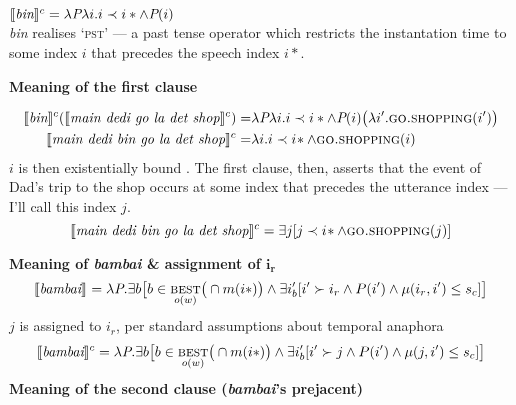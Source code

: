 $\denote[c]{\textit{bin}}= \lambda\textit{P}\lambda i.i\prec i*\wedge\textit{P}(i)$\\
 \textit{bin} realises `\textsc{pst}' --- a past tense operator which restricts the instantation time to some index $ i $ that precedes the speech index $ i* $.
 

\a \textbf{Meaning of the first clause}

\begin{align*}
\denote[c]{\textit{bin}}(\denote[c]{\textit{main dedi go la det shop}})=&\lambda\textit{P}\lambda i.i\prec i*\wedge\textit{P}(i)\big(\lambda i'.\textsc{go.shopping}(i')\big)\\
\denote[c]{\textit{main dedi bin go la det shop}}=&\lambda i.i\prec i\!*\wedge \textsc{go.shopping}(i)%
\end{align*}
$ i $ is then existentially bound \citep{Dowty1979,Stump1985,Ogihara1996}. The first clause, then, asserts that the event of Dad's trip to the shop occurs at some index that precedes the utterance index --- I'll call this index $ j $.
$$ \denote[c]{\textit{main dedi bin go la det shop}}=\exists j[j\prec i\!*\wedge \textsc{go.shopping}(j)] $$




\a \textbf{Meaning of \textit{bambai} \& assignment of $ \boldsymbol{i_r} $}
$$	\denote{\textit{bambai}}=\lambda\textit{P}.\exists b
	\big[b\in\underset{o(w)}{\textsc{best}}\big(\cap m(i*)\big)\wedge \exists i'_b[i'\succ i_r\wedge P(i')\wedge\mu(i_r,i')\leq s_c]\big]$$
	$ j $ is assigned to $ i_r $, per standard assumptions about temporal anaphora \citetext{\textit{e.g.}, \citealt{Hinrihcs1986,Partee}, these insights have been implemented in DRT frameworks \S~\ref{bambai.subord}, see chapter 5 of \citealt{Kamp1993}.}
$$	\denote[c]{\textit{bambai}}=\lambda\textit{P}.\exists b
	\big[b\in\underset{o(w)}{\textsc{best}}\big(\cap m(i*)\big)\wedge \exists i'_b[i'\succ j\wedge P(i')\wedge\mu(j,i')\leq s_c]\big]$$
\a{} \textbf{Meaning of the second clause (\textit{bambai}'s prejacent)}

